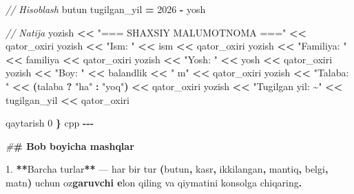 \documentclass[a4paper,11pt,twoside,openright]{book}
\newenvironment{Shaded}{\begin{snugshade}}{\end{snugshade}}
\newcommand{\CharTok}[1]{\textcolor[rgb]{0.31,0.60,0.02}{#1}}
\newcommand{\CommentTok}[1]{\textcolor[rgb]{0.56,0.35,0.01}{\textit{#1}}}
\newcommand{\DecValTok}[1]{\textcolor[rgb]{0.00,0.00,0.81}{#1}}
\newcommand{\ErrorTok}[1]{\textcolor[rgb]{0.64,0.00,0.00}{\textbf{#1}}}
\newcommand{\FloatTok}[1]{\textcolor[rgb]{0.00,0.00,0.81}{#1}}
\newcommand{\NormalTok}[1]{#1}
\newcommand{\OperatorTok}[1]{\textcolor[rgb]{0.81,0.36,0.00}{\textbf{#1}}}
\newcommand{\PreprocessorTok}[1]{\textcolor[rgb]{0.56,0.35,0.01}{\textit{#1}}}
\newcommand{\StringTok}[1]{\textcolor[rgb]{0.31,0.60,0.02}{#1}}
\begin{document}
\begin{Shaded}
\begin{Highlighting}[]
    \CommentTok{// Hisoblash}
\NormalTok{    butun tugilgan\_yil }\OperatorTok{=} \DecValTok{2026} \OperatorTok{{-}}\NormalTok{ yosh}

    \CommentTok{// Natija}
\NormalTok{    yozish }\OperatorTok{\textless{}\textless{}} \StringTok{"=== SHAXSIY MA\textquotesingle{}LUMOTNOMA ==="} \OperatorTok{\textless{}\textless{}}\NormalTok{ qator\_oxiri}
\NormalTok{    yozish }\OperatorTok{\textless{}\textless{}} \StringTok{"Ism: "} \OperatorTok{\textless{}\textless{}}\NormalTok{ ism }\OperatorTok{\textless{}\textless{}}\NormalTok{ qator\_oxiri}
\NormalTok{    yozish }\OperatorTok{\textless{}\textless{}} \StringTok{"Familiya: "} \OperatorTok{\textless{}\textless{}}\NormalTok{ familiya }\OperatorTok{\textless{}\textless{}}\NormalTok{ qator\_oxiri}
\NormalTok{    yozish }\OperatorTok{\textless{}\textless{}} \StringTok{"Yosh: "} \OperatorTok{\textless{}\textless{}}\NormalTok{ yosh }\OperatorTok{\textless{}\textless{}}\NormalTok{ qator\_oxiri}
\NormalTok{    yozish }\OperatorTok{\textless{}\textless{}} \StringTok{"Bo\textquotesingle{}y: "} \OperatorTok{\textless{}\textless{}}\NormalTok{ balandlik }\OperatorTok{\textless{}\textless{}} \StringTok{" m"} \OperatorTok{\textless{}\textless{}}\NormalTok{ qator\_oxiri}
\NormalTok{    yozish }\OperatorTok{\textless{}\textless{}} \StringTok{"Talaba: "} \OperatorTok{\textless{}\textless{}} \OperatorTok{(}\NormalTok{talaba }\OperatorTok{?} \StringTok{"ha"} \OperatorTok{:} \StringTok{"yo\textquotesingle{}q"}\OperatorTok{)} \OperatorTok{\textless{}\textless{}}\NormalTok{ qator\_oxiri}
\NormalTok{    yozish }\OperatorTok{\textless{}\textless{}} \StringTok{"Tug\textquotesingle{}ilgan yil: \textasciitilde{}"} \OperatorTok{\textless{}\textless{}}\NormalTok{ tugilgan\_yil }\OperatorTok{\textless{}\textless{}}\NormalTok{ qator\_oxiri}

\NormalTok{    qaytarish }\DecValTok{0}
\OperatorTok{\}}
\ErrorTok{\textasciigrave{}\textasciigrave{}\textasciigrave{}}\NormalTok{cpp}
\OperatorTok{{-}{-}{-}}

\PreprocessorTok{\#}\ErrorTok{\# Bob bo\textquotesingle{}yicha mashqlar}

\FloatTok{1.} \OperatorTok{**}\NormalTok{Barcha turlar}\OperatorTok{**}\NormalTok{ — har bir tur }\OperatorTok{(}\ErrorTok{\textasciigrave{}}\NormalTok{butun}\ErrorTok{\textasciigrave{}}\OperatorTok{,} \ErrorTok{\textasciigrave{}}\NormalTok{kasr}\ErrorTok{\textasciigrave{}}\OperatorTok{,} \ErrorTok{\textasciigrave{}}\NormalTok{ikkilangan}\ErrorTok{\textasciigrave{}}\OperatorTok{,} \ErrorTok{\textasciigrave{}}\NormalTok{mantiq}\ErrorTok{\textasciigrave{}}\OperatorTok{,} \ErrorTok{\textasciigrave{}}\NormalTok{belgi}\ErrorTok{\textasciigrave{}}\OperatorTok{,} \ErrorTok{\textasciigrave{}}\NormalTok{matn}\ErrorTok{\textasciigrave{}}\OperatorTok{)}\NormalTok{ uchun o}\CharTok{\textquotesingle{}z}\ErrorTok{garuvchi e}\CharTok{\textquotesingle{}}\NormalTok{lon qiling va qiymatini konsolga chiqaring}\OperatorTok{.}


\end{Highlighting}
\end{Shaded}
\end{document}
